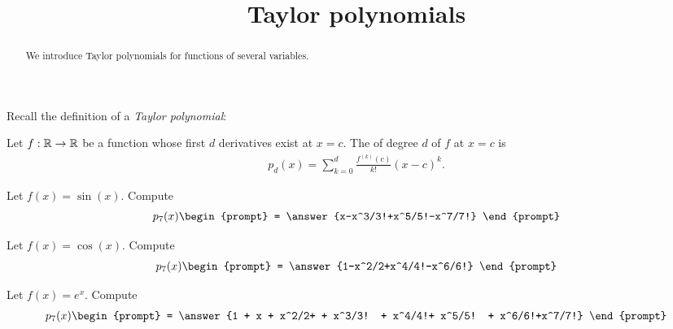 \documentclass{ximera}
\title[Dig-In:]{Taylor polynomials}
\begin{document}
\begin{abstract}
  We introduce Taylor polynomials for functions of several variables.
\end{abstract}
\maketitle


Recall the definition of a \textit{Taylor polynomial}:

\begin{definition}
  Let $f:\mathbb R\to\mathbb R$ be a function whose first $d$ derivatives exist at $x=c$.
  The  of degree $d$ of $f$ at $x=c$ is
  \begin{align*}
    p_d(x) = \sum_{k=0}^d\frac{f^{(k)}(c)}{k!}(x-c)^k.
  \end{align*}
\end{definition}

\begin{question}
  Let $f(x) = \sin(x)$. Compute
  \[
  p_7(x)\begin{prompt}
    = \answer{x-x^3/3!+x^5/5!-x^7/7!}
  \end{prompt}
  \]
  \begin{question}
  Let $f(x) = \cos(x)$. Compute
  \[
  p_7(x)\begin{prompt}
    = \answer{1-x^2/2+x^4/4!-x^6/6!}
  \end{prompt}
  \]
  \begin{question}
    Let $f(x) = e^x$. Compute
    \[
    p_7(x)\begin{prompt}
      = \answer{1 + x + x^2/2+ + x^3/3! + x^4/4!+ x^5/5! + x^6/6!+x^7/7!}
    \end{prompt}
    \]
  \end{question}
\end{question}
\end{question}
\end{document}
